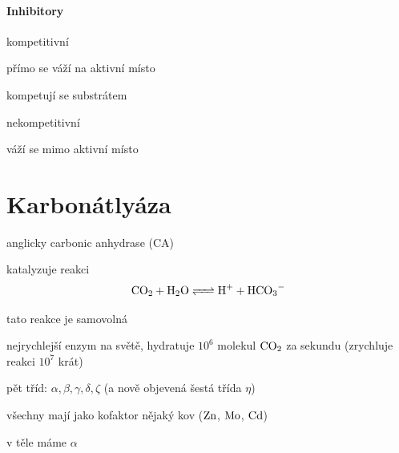 \documentclass[DIV=8]{scrreprt}
\begin{document}
\paragraph{Inhibitory}
\begin{myItemize}[nosep]
    \item kompetitivní
\begin{myItemize}[nosep]
    \item přímo se váží na aktivní místo
    \item kompetují se substrátem
\end{myItemize}

    \item nekompetitivní
\begin{myItemize}[nosep]
    \item váží se mimo aktivní místo
\end{myItemize}

\end{myItemize}



\section{Karbonátlyáza} \label{Karbonátlyáza} \FloatBarrier


\begin{myItemize}[nosep]
    \item anglicky carbonic anhydrase (CA)
    \item katalyzuje reakci
\[\ce{CO2 + H2O <=> H+ + HCO3-}\]
\begin{myItemize}[nosep]
    \item tato reakce je samovolná
\end{myItemize}

    \item nejrychlejší enzym na světě, hydratuje \(10^6\) molekul \(\ce{CO2}\) za sekundu (zrychluje reakci \(10^7\) krát)
    \item pět tříd: \(\alpha, \beta, \gamma, \delta, \zeta\) (a nově objevená šestá třída \(\eta\))
\begin{myItemize}[nosep]
    \item všechny mají jako kofaktor nějaký kov (\(\ce{Zn}\), \(\ce{Mo}\), \(\ce{Cd}\))
    \item v těle máme \(\alpha\)
\end{myItemize}

\end{myItemize}
\end{document}
